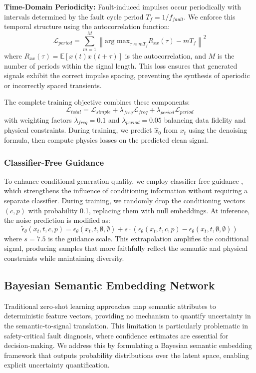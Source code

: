 \textbf{Time-Domain Periodicity:} Fault-induced impulses occur periodically with intervals determined by the fault cycle period $T_f = 1/f_{fault}$. We enforce this temporal structure using the autocorrelation function:
\begin{equation}
    \mathcal{L}_{period} = \sum_{m=1}^M \left\| \text{arg max}_{\tau \approx m T_f} R_{xx}(\tau) - m T_f \right\|^2
    \label{eq:period_loss}
\end{equation}
where $R_{xx}(\tau) = \mathbb{E}[x(t)x(t+\tau)]$ is the autocorrelation, and $M$ is the number of periods within the signal length. This loss ensures that generated signals exhibit the correct impulse spacing, preventing the synthesis of aperiodic or incorrectly spaced transients.

The complete training objective combines these components:
\begin{equation}
    \mathcal{L}_{total} = \mathcal{L}_{simple} + \lambda_{freq} \mathcal{L}_{freq} + \lambda_{period} \mathcal{L}_{period}
    \label{eq:total_loss}
\end{equation}
with weighting factors $\lambda_{freq}=0.1$ and $\lambda_{period}=0.05$ balancing data fidelity and physical constraints. During training, we predict $\hat{x}_0$ from $x_t$ using the denoising formula, then compute physics losses on the predicted clean signal.

\subsubsection{Classifier-Free Guidance}
To enhance conditional generation quality, we employ classifier-free guidance \cite{ho2022classifier}, which strengthens the influence of conditioning information without requiring a separate classifier. During training, we randomly drop the conditioning vectors $(c, p)$ with probability 0.1, replacing them with null embeddings. At inference, the noise prediction is modified as:
\begin{equation}
    \tilde{\epsilon}_\theta(x_t, t, c, p) = \epsilon_\theta(x_t, t, \emptyset, \emptyset) + s \cdot (\epsilon_\theta(x_t, t, c, p) - \epsilon_\theta(x_t, t, \emptyset, \emptyset))
    \label{eq:cfg}
\end{equation}
where $s=7.5$ is the guidance scale. This extrapolation amplifies the conditional signal, producing samples that more faithfully reflect the semantic and physical constraints while maintaining diversity.


\subsection{Bayesian Semantic Embedding Network}
Traditional zero-shot learning approaches map semantic attributes to deterministic feature vectors, providing no mechanism to quantify uncertainty in the semantic-to-signal translation. This limitation is particularly problematic in safety-critical fault diagnosis, where confidence estimates are essential for decision-making. We address this by formulating a Bayesian semantic embedding framework that outputs probability distributions over the latent space, enabling explicit uncertainty quantification.

